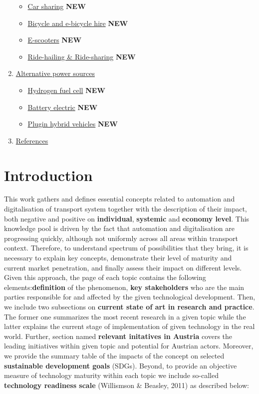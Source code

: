 \documentclass[
]{book}
\providecommand{\tightlist}{%
  \setlength{\itemsep}{0pt}\setlength{\parskip}{0pt}}
\begin{document}
\begin{enumerate}
  \begin{itemize}
  \tightlist
  \item
    \protect\hyperlink{car_sharing}{Car sharing} \textbf{NEW}
  \item
    \protect\hyperlink{bike_sharing}{Bicycle and e-bicycle hire} \textbf{NEW}
  \item
    \protect\hyperlink{scooters}{E-scooters} \textbf{NEW}
  \item
    \protect\hyperlink{ride_hailing}{Ride-hailing \& Ride-sharing} \textbf{NEW}
  \end{itemize}
\item
  \protect\hyperlink{alternative}{Alternative power sources}

  \begin{itemize}
  \tightlist
  \item
    \protect\hyperlink{FCEV}{Hydrogen fuel cell} \textbf{NEW}
  \item
    \protect\hyperlink{bev}{Battery electric} \textbf{NEW}
  \item
    \protect\hyperlink{plugin_hybrid}{Plugin hybrid vehicles} \textbf{NEW}
  \end{itemize}
\item
  \protect\hyperlink{reference}{References}
\end{enumerate}

\hypertarget{intro}{%
\chapter{Introduction}\label{intro}}

This work gathers and defines essential concepts related to automation and digitalisation of transport system together with the description of their impact, both negative and positive on \textbf{individual}, \textbf{systemic} and \textbf{economy level}. This knowledge pool is driven by the fact that automation and digitalisation are progressing quickly, although not uniformly across all areas within transport context. Therefore, to understand spectrum of possibilities that they bring, it is necessary to explain key concepts, demonstrate their level of maturity and current market penetration, and finally assess their impact on different levels. Given this approach, the page of each topic contains the following elements:\textbf{definition} of the phenomenon,
\textbf{key stakeholders} who are the main parties responsible for and affected by the given technological development. Then, we include two subsections on \textbf{current state of art in research and practice}. The former one summarizes the most recent research in a given topic while the latter explains the current stage of implementation of given technology in the real world. Further, section named \textbf{relevant initatives in Austria} covers the leading initiatives within given topic and potential for Austrian actors. Moreover, we provide the summary table of the impacts of the concept on selected \textbf{sustainable development goals} (SDGs). Beyond, to provide an objective measure of technology maturity within each topic we include so-called \textbf{technology readiness scale} (Willismson \& Beasley, 2011) as described below:
\end{document}

